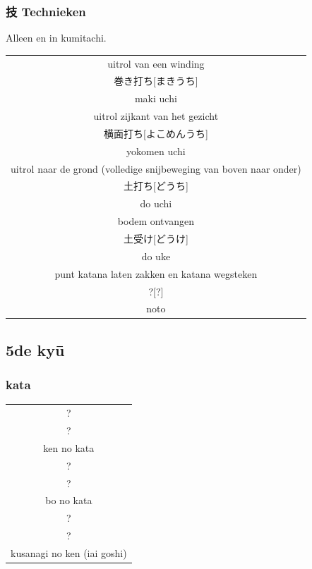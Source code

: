 \documentclass[a4paper, 12pt]{article}
\begin{document}
\begin{CJK}{UTF8}{min}
\subsubsection{技 Technieken}
\noindent Alleen en in kumitachi.
\begin{table}[H]
\begin{center}
\begin{tabular}{c}
uitrol van een winding\\
巻き打ち[まきうち]\\
maki uchi\\
\hline
uitrol zijkant van het gezicht\\
横面打ち[よこめんうち]\\
yokomen uchi\\
\hline
uitrol naar de grond (volledige snijbeweging van boven naar onder)\\
土打ち[どうち]\\
do uchi\\
\hline
bodem ontvangen\\
土受け[どうけ]\\
do uke\\
\hline
punt katana laten zakken en katana wegsteken\\
?[?]\\
noto
\end{tabular}
\end{center}
\label{kyuu_6_katori_other}
\end{table}

\subsection{5de ky\={u}}
\subsubsection{kata}
\begin{table}[H]
\begin{center}
\begin{tabular}{c}
?\\
?\\
ken no kata\\
\hline
?\\
?\\
bo no kata\\
\hline
?\\
?\\
kusanagi no ken (iai goshi)
\end{tabular}
\end{center}
\label{kyuu_5_katori_kata}
\end{table}


\end{CJK}
\end{document}
